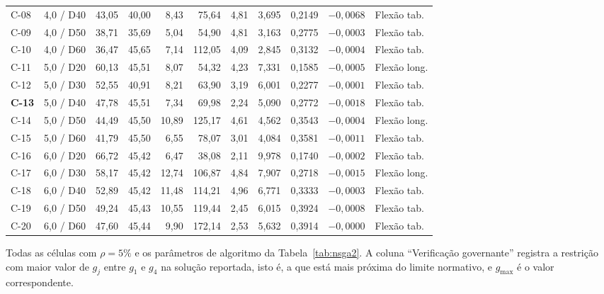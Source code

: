 \begin{table}[!ht]
\begin{threeparttable}
\begin{tabular*}{\textwidth}{@{\extracolsep{\fill}}llrrrrrrrrl@{\extracolsep{\fill}}}
C-08 & 4{,}0 / D40 & 43{,}05 & 40{,}00 & 8{,}43 & 75{,}64 & 4{,}81 & 3{,}695 & 0{,}2149 & $-0{,}0068$ & Flexão tab. \\
C-09 & 4{,}0 / D50 & 38{,}71 & 35{,}69 & 5{,}04 & 54{,}90 & 4{,}81 & 3{,}163 & 0{,}2775 & $-0{,}0003$ & Flexão tab. \\
C-10 & 4{,}0 / D60 & 36{,}47 & 45{,}65 & 7{,}14 & 112{,}05 & 4{,}09 & 2{,}845 & 0{,}3132 & $-0{,}0004$ & Flexão tab. \\
\midrule
C-11 & 5{,}0 / D20 & 60{,}13 & 45{,}51 & 8{,}07 & 54{,}32 & 4{,}23 & 7{,}331 & 0{,}1585 & $-0{,}0005$ & Flexão long. \\
C-12 & 5{,}0 / D30 & 52{,}55 & 40{,}91 & 8{,}21 & 63{,}90 & 3{,}19 & 6{,}001 & 0{,}2277 & $-0{,}0001$ & Flexão tab. \\
\textbf{C-13} & 5{,}0 / D40 & 47{,}78 & 45{,}51 & 7{,}34 & 69{,}98 & 2{,}24 & 5{,}090 & 0{,}2772 & $-0{,}0018$ & Flexão tab. \\
C-14 & 5{,}0 / D50 & 44{,}49 & 45{,}50 & 10{,}89 & 125{,}17 & 4{,}61 & 4{,}562 & 0{,}3543 & $-0{,}0004$ & Flexão long. \\
C-15 & 5{,}0 / D60 & 41{,}79 & 45{,}50 & 6{,}55 & 78{,}07 & 3{,}01 & 4{,}084 & 0{,}3581 & $-0{,}0011$ & Flexão tab. \\
\midrule
C-16 & 6{,}0 / D20 & 66{,}72 & 45{,}42 & 6{,}47 & 38{,}08 & 2{,}11 & 9{,}978 & 0{,}1740 & $-0{,}0002$ & Flexão tab. \\
C-17 & 6{,}0 / D30 & 58{,}17 & 45{,}42 & 12{,}74 & 106{,}87 & 4{,}84 & 7{,}907 & 0{,}2718 & $-0{,}0015$ & Flexão long. \\
C-18 & 6{,}0 / D40 & 52{,}89 & 45{,}42 & 11{,}48 & 114{,}21 & 4{,}96 & 6{,}771 & 0{,}3333 & $-0{,}0003$ & Flexão tab. \\
C-19 & 6{,}0 / D50 & 49{,}24 & 45{,}43 & 10{,}55 & 119{,}44 & 2{,}45 & 6{,}015 & 0{,}3924 & $-0{,}0008$ & Flexão tab. \\
C-20 & 6{,}0 / D60 & 47{,}60 & 45{,}44 & 9{,}90 & 172{,}14 & 2{,}53 & 5{,}632 & 0{,}3914 & $-0{,}0000$ & Flexão tab. \\
\bottomrule
\end{tabular*}
\begin{tablenotes}
\footnotesize
\item Todas as células com $\rho = 5\%$ e os parâmetros de algoritmo da Tabela~\ref{tab:nsga2}.
A coluna ``Verificação governante'' registra a restrição com maior valor de $g_j$ entre $g_1$ e $g_4$ na solução reportada, isto é, a que está mais próxima do limite normativo, e $g_{\max}$ é o valor correspondente.
\end{tablenotes}
\end{threeparttable}
\end{table}

